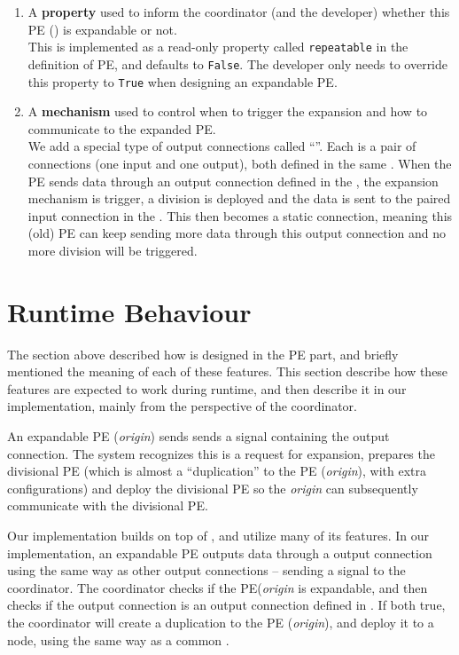 
\begin{enumerate}
	\item A \textbf{property} used to inform the coordinator (and the developer) whether this PE (\tPETmpl) is expandable or not. \\
	This is implemented as a read-only property called \lstinline|repeatable| in the definition of PE, and defaults to \lstinline|False|. The developer only needs to override this property to \lstinline|True| when designing an expandable PE.
	\item A \textbf{mechanism} used to control when to trigger the expansion and how to communicate to the expanded PE. \\
	We add a special type of output connections called ``\tcircuit''. Each \tcircuit is a pair of connections (one input and one output), both defined in the same \tPETmpl. When the PE sends data through an output connection defined in the \tcircuit, the expansion mechanism is trigger, a division is deployed and the data is sent to the paired input connection in the \tcircuit. This \tcircuit then becomes a static connection, meaning this (old) PE can keep sending more data through this output connection and no more division will be triggered.
\end{enumerate}

\section{Runtime Behaviour}
The section above described how \tdynexp is designed in the PE part, and briefly mentioned the meaning of each of these features. This section describe how these features are expected to work during runtime, and then describe it in our implementation, mainly from the perspective of the coordinator.

An expandable PE (\emph{origin}) sends sends a signal containing the \tcircuit output connection. The system recognizes this is a request for expansion, prepares the divisional PE (which is almost a ``duplication'' to the PE (\emph{origin}), with extra configurations) and deploy the divisional PE so the \emph{origin} can subsequently communicate with the divisional PE.

Our implementation builds on top of \tincdep, and utilize many of its features. In our implementation, an expandable PE outputs data through a \tcircuit output connection using the same way as other output connections -- sending a signal to the coordinator. The coordinator checks if the PE(\emph{origin} is expandable, and then checks if the output connection is an output connection defined in \tcircuit. If both true, the coordinator will create a duplication to the PE (\emph{origin}), and deploy it to a node, using the same way as a common \tincdep.

